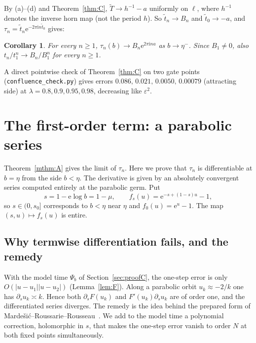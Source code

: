 \documentclass[11pt]{amsart}
\newtheorem{corollary}[theorem]{Corollary}
\theoremstyle{definition}
\newcommand{\eee}{\mathrm{e}}
\newcommand{\ii}{\mathrm{i}}
\begin{document}
By (a)--(d) and Theorem~\ref{thm:C}, $\tilde T\to h^{-1}-a$ uniformly on
$\ell$, where $h^{-1}$ denotes the inverse horn map (not the period $h$).
So $\tilde t_n\to B_n$ and $\tilde t_0\to-a$, and
$\tau_n=\tilde t_n\eee^{-2\pi\ii n\tilde t_0}$ gives:

\begin{corollary}\label{cor:tauconv}
For every $n\ge1$, $\tau_n(b)\to B_n\eee^{2\pi\ii na}$ as $b\to\eta^-$.
Since $B_1\ne0$, also $t_n/t_1^n\to B_n/B_1^n$ for every $n\ge1$.
\end{corollary}

\noindent
A direct pointwise check of Theorem~\ref{thm:C} on two gate points
(\texttt{confluence\_check.py}) gives errors
$0.086,\,0.021,\,0.0050,\,0.00079$ (attracting side) at
$\lambda=0.8,0.9,0.95,0.98$, decreasing like $\varepsilon^2$.

\section{The first-order term: a parabolic series}\label{sec:first}

Theorem~\ref{mthm:A} gives the limit of $\tau_n$.  Here we prove that $\tau_n$ is
differentiable at $b=\eta$ from the side $b<\eta$.  The derivative is given by an
absolutely convergent series computed entirely at the parabolic germ.  Put
\[
 s=1-\eee\log b=1-\mu,\qquad f_s(u)=\eee^{-s+(1-s)u}-1 ,
\]
so $s\in(0,s_0]$ corresponds to $b<\eta$ near $\eta$ and $f_0(u)=\eee^u-1$.  The
map $(s,u)\mapsto f_s(u)$ is entire.

\subsection{Why termwise differentiation fails, and the remedy}
With the model time $\Psi_b$ of Section~\ref{sec:proofC}, the one-step error is
only $O(|u-u_1||u-u_2|)$ (Lemma~\ref{lem:F}).  Along a parabolic orbit
$u_k\approx-2/k$ one has $\partial_su_k\asymp k$.  Hence both $\partial_sF(u_k)$ and
$F'(u_k)\partial_su_k$ are of order one, and the differentiated series diverges.
The remedy is the idea behind the prepared form of
Marde\v{s}i\'c--Roussarie--Rousseau~\cite{MRR2004}.  We add to the model time a
polynomial correction, holomorphic in $s$, that makes the one-step error vanish
to order $N$ at both fixed points simultaneously.
\end{document}
